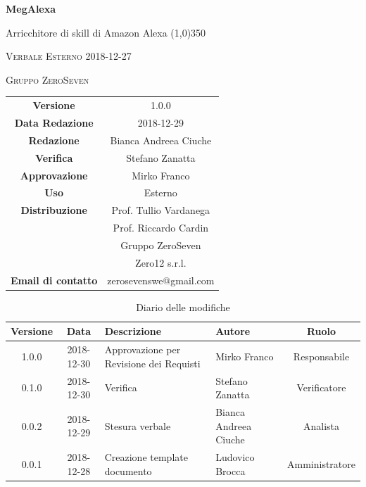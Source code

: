 \documentclass[a4paper,12pt]{article}
\author{Bianca Ciuche}
\date{2018-12-27}
\begin{document}
\begin{titlepage}
	\centering
	{\huge\bfseries MegAlexa\par}
	Arricchitore di skill di Amazon Alexa
	\line(1,0){350} \\
	{\scshape\LARGE Verbale Esterno 2018-12-27 \par}
	\vspace{1cm}
	{\scshape Gruppo ZeroSeven \par}
	\logo
	\begin{tabular}{c|c}
		{\hfill \textbf{Versione}} 			& 1.0.0				\\
		{\hfill\textbf{Data Redazione}} 	& 2018-12-29		\\ 
		{\hfill\textbf{Redazione}} 			&  		Bianca Andreea Ciuche	\\ 
		{\hfill\textbf{Verifica}} 				&  	Stefano Zanatta			\\ 
		{\hfill\textbf{Approvazione}} 		&  		Mirko Franco	\\ 
		{\hfill\textbf{Uso}} 					& 	Esterno	\\ 
		{\hfill\textbf{Distribuzione}} 			& 			Prof. Tullio Vardanega \\ & Prof. Riccardo Cardin \\ & Gruppo ZeroSeven	\\ & Zero12 s.r.l. \\
		{\hfill\textbf{Email di contatto}} & zerosevenswe@gmail.com \\
	\end{tabular}
\end{titlepage}
	
		\label{LastFrontPage}
	
	
	\newpage
	\cleardoublepage
	\begin{table}[tbph]
		\centering
		\begin{tabularx}{\textwidth}{|c|c|X|X|c|}
			\hline
			\textbf{Versione} & \textbf{Data} & \textbf{Descrizione} & \textbf{Autore} & \textbf{Ruolo} \\
			\hline
			1.0.0 & 2018-12-30 & Approvazione per Revisione dei Requisti & Mirko Franco & Responsabile \\
			\hline
			0.1.0 & 2018-12-30 & Verifica & Stefano Zanatta &Verificatore \\
			\hline
			0.0.2 & 2018-12-29 & Stesura verbale & Bianca Andreea Ciuche &Analista \\
			\hline
			0.0.1 & 2018-12-28 & Creazione template documento
			& Ludovico Brocca & Amministratore\\
			\hline
		\end{tabularx}
		\caption{Diario delle modifiche}
	\end{table}
	
\end{document}
